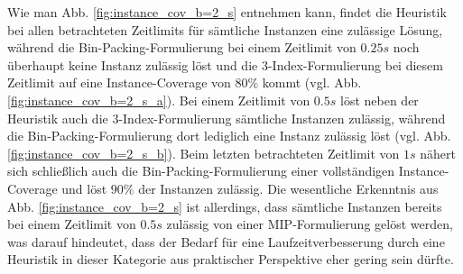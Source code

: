 Wie man Abb. \ref{fig:instance_cov_b=2_s} entnehmen kann, findet die Heuristik bei allen betrachteten Zeitlimits für sämtliche Instanzen eine zulässige Lösung, während die Bin-Packing-Formulierung bei einem Zeitlimit von $0.25s$ noch überhaupt keine Instanz zulässig löst und die 3-Index-Formulierung bei diesem Zeitlimit auf eine Instance-Coverage von $80 \%$ kommt (vgl. Abb. \ref{fig:instance_cov_b=2_s_a}). Bei einem Zeitlimit von $0.5s$ löst neben der Heuristik auch die 3-Index-Formulierung sämtliche Instanzen zulässig, während die Bin-Packing-Formulierung dort lediglich eine Instanz zulässig löst (vgl. Abb. \ref{fig:instance_cov_b=2_s_b}). Beim letzten betrachteten Zeitlimit von $1s$ nähert sich schließlich auch die Bin-Packing-Formulierung einer vollständigen Instance-Coverage und löst $90 \%$ der Instanzen zulässig.\newline
Die wesentliche Erkenntnis aus Abb. \ref{fig:instance_cov_b=2_s} ist allerdings, dass sämtliche Instanzen bereits bei einem Zeitlimit von $0.5s$ zulässig von einer MIP-Formulierung gelöst werden, was darauf hindeutet, dass der Bedarf für eine Laufzeitverbesserung durch eine Heuristik in dieser Kategorie aus praktischer Perspektive eher gering sein dürfte.

\vfill
\pagebreak

